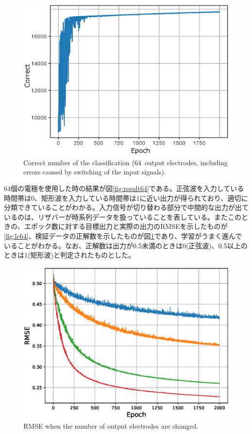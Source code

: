 \documentclass[a4j, twocolumn]{jsarticle}
\begin{document}
\begin{figure}
\centering
\includegraphics[width=1\hsize]{./figures/learning_curvesinsqr128_32i_l_hilsinsqr128_32i_l2_hil_num_neuron64_ramdomselected_timesequence_epoch2000_batchsize128_mask10_eta30_transition0_loopnum9_r} 
\caption{Correct number of the classification (64~output electrodes, including errors caused by switching of the input signals).}
\label{fig:nc64}
\end{figure}

64個の電極を使用した時の結果が図\ref{fig:result64}である。正弦波を入力している時間帯は0、矩形波を入力している時間帯は1に近い出力が得られており、適切に分類できていることがわかる。入力信号が切り替わる部分で中間的な出力が出ているのは、リザバーが時系列データを扱っていることを表している。またこのときの、エポック数に対する目標出力と実際の出力のRMSEを示したものが\ref{fig:lc64}、検証データの正解数を示したものが図\ref{fig:nc64}であり、学習がうまく進んでいることがわかる。なお、正解数は出力が0.5未満のときは0(正弦波)、0.5以上のときは1(矩形波)と判定されたものとした。

\begin{figure}
\centering
\includegraphics[width=1\hsize]{./figures/rmsevs_r2} 
\caption{RMSE when the number of output electrodes are changed.}
\label{fig:rmsevs}
\end{figure}
\end{document}
